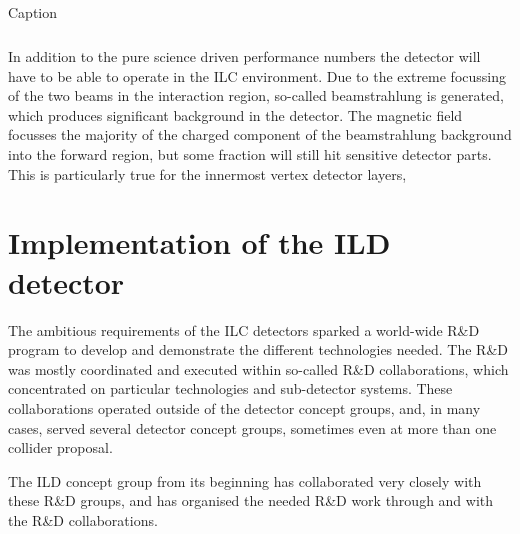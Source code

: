 \documentclass[%
 amsmath,amssymb,
 aps,
]{revtex4-1}
\newcommand{\bottomrule}{\hline}
\begin{document}
\begin{table}[]
\begin{tabular}{|l|l|c|c|p{4cm}|}
        
\bottomrule
    \end{tabular}
    \caption{Caption}
    \label{tab:my_label}
\end{table}


In addition to the pure science driven performance numbers the detector will have to be able to operate in the ILC environment. Due to the extreme focussing of the two beams in the interaction region, so-called beamstrahlung is generated, which produces significant background in the detector. The magnetic field focusses the majority of the charged component of the beamstrahlung background into the forward region, but some fraction will still hit sensitive detector parts. This is particularly true for the innermost vertex detector layers, 


\section{Implementation of the ILD detector}
The ambitious requirements of the ILC detectors sparked a world-wide R\&D program to develop and demonstrate the different technologies needed. The R\&D was mostly coordinated and executed within so-called R\&D collaborations, which concentrated on particular technologies and sub-detector systems. These collaborations operated outside of the detector concept groups, and, in many cases, served several detector concept groups, sometimes even at more than one collider proposal. 

The ILD concept group from its beginning has collaborated very closely with these R\&D groups, and has organised the needed R\&D work through and with the R\&D collaborations. 
\end{document}
